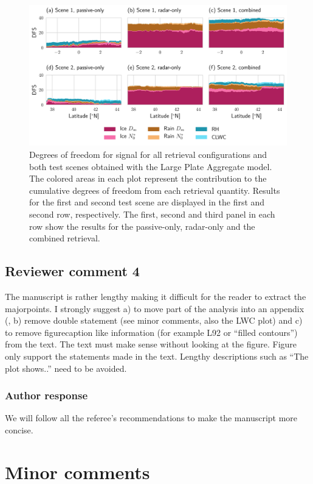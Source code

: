 \documentclass[11pt]{scrartcl}
\begin{document}
\begin{figure}[!hbpt]
  \centering
  \includegraphics[width=\textwidth]{../plots/dfs}
\caption{Degrees of freedom for signal for all retrieval configurations and both
  test scenes obtained with the Large Plate Aggregate model. The colored areas
  in each plot represent the contribution to the cumulative degrees of freedom
  from each retrieval quantity. Results for the first and second test scene
  are displayed in the first and second row, respectively. The first, second
  and third panel in each row show the results for the passive-only, radar-only
  and the combined retrieval.}
\label{fig:dfs}
\end{figure}

\subsection*{Reviewer comment 4}

The manuscript is rather lengthy making it difficult for the reader to
extract the majorpoints. I strongly suggest a) to move part of the analysis into
an appendix (, b) remove double statement (see minor comments, also the LWC
plot) and c) to remove figurecaption like information (for example L92 or
“filled contours”) from the text. The text must make sense without looking at
the figure. Figure only support the statements made in the text. Lengthy
descriptions such as “The plot shows..” need to be avoided.

\subsubsection*{Author response}

We will follow all the referee's recommendations to make the manuscript more
concise.

\section{Minor comments}
\end{document}
